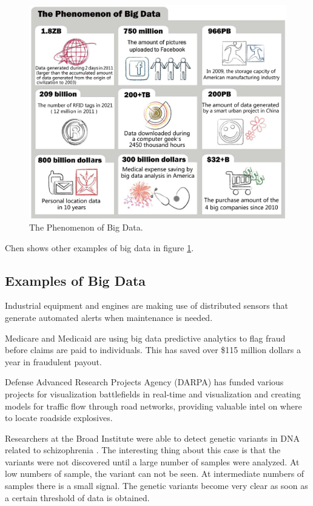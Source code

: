 \documentclass[]{article}
\begin{document}
\begin{figure}
	\centering
	\includegraphics[width=0.8\linewidth]{img/big-data}
	\caption[The Phenomenon of Big Data.]{The Phenomenon of Big Data.\cite{chen_big_2014}}
	\label{fig:big-data}
\end{figure}

Chen shows other examples of big data in figure \ref{fig:big-data}.

\subsection{Examples of Big Data}\label{ssec:examples-of-big-data}
Industrial equipment and engines are making use of distributed sensors that generate automated alerts when maintenance is needed\cite{destiche}.

Medicare and Medicaid are using big data predictive analytics to flag fraud before claims are paid to individuals. This has saved over \$115 million dollars a year in fraudulent payout\cite{medicaid}.

Defense Advanced Research Projects Agency (DARPA) has funded various projects for visualization battlefields in real-time and visualization and creating models for traffic flow through road networks, providing valuable intel on where to locate roadside explosives\cite{pcast}.

Researchers at the Broad Institute were able to detect genetic variants in DNA related to schizophrenia \cite{pcast}. The interesting thing about this case is that the variants were not discovered until a large number of samples were analyzed. At low numbers of sample, the variant can not be seen. At intermediate numbers of samples there is a small signal. The genetic  variants become very clear as soon as a certain threshold of data is obtained.
\end{document}
